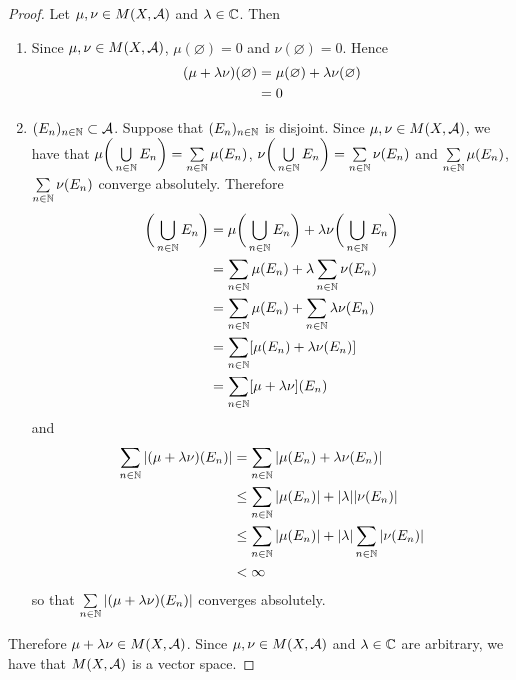 \documentclass{book}
\begin{document}
	\begin{proof}
		Let $\mu, \nu \in M(X, \mathcal{A})$ and $\lambda \in \mathbb{C}$. Then
		\begin{enumerate}
			\item Since $\mu,\nu \in M(X, \mathcal{A})$, $\mu(\varnothing) = 0$ and $\nu(\varnothing) = 0$. Hence
			\begin{align*}
				(\mu + \lambda \nu)(\varnothing)
				& = \mu(\varnothing) + \lambda \nu(\varnothing) \\
				& = 0
			\end{align*}
			\item $(E_n)_{n \in \mathbb{N}} \subset \mathcal{A}$. Suppose that $(E_n)_{n \in \mathbb{N}}$ is disjoint. Since $\mu,\nu \in M(X, \mathcal{A})$, we have that $\mu \bigg( \bigcup\limits_{n \in \mathbb{N}} E_n \bigg ) = \sum\limits_{n \in \mathbb{N}} \mu(E_n)$, $\nu \bigg( \bigcup\limits_{n \in \mathbb{N}} E_n \bigg) = \sum\limits_{n \in \mathbb{N}} \nu(E_n)$ and  $\sum\limits_{n \in \mathbb{N}} \mu(E_n)$, $\sum\limits_{n \in \mathbb{N}} \nu(E_n)$ converge absolutely. Therefore 
			\begin{align*}
				[\mu + \lam \nu] \bigg(  \bigcup_{n \in \N} E_n \bigg)
				& = \mu \bigg( \bigcup_{n \in \N} E_n \bigg ) + \lam \nu \bigg( \bigcup_{n \in \N} E_n \bigg ) \\
				& = \sum_{n \in \N} \mu(E_n) + \lam \sum_{n \in \N} \nu(E_n) \\
				& = \sum_{n \in \N} \mu(E_n) + \sum_{n \in \N} \lam \nu(E_n) \\
				& = \sum_{n \in \N}  [\mu(E_n)  + \lam \nu(E_n)] \\
				& = \sum_{n \in \N} [\mu + \lam \nu](E_n) \\
			\end{align*}
			and 
			\begin{align*}
				\sum_{n \in \mathbb{N}} | (\mu + \lambda \nu)(E_n) |
				& = \sum_{n \in \mathbb{N}} | \mu(E_n)  + \lambda \nu(E_n) | \\
				& \leq \sum_{n \in \mathbb{N}}  | \mu(E_n) |  + |\lambda| | \nu(E_n) | \\
				& \leq \sum_{n \in \mathbb{N}}  | \mu(E_n) |  + |\lambda|  \sum_{n \in \mathbb{N}} | \nu(E_n) | \\
				& < \infty 
			\end{align*}
			so that $\sum\limits_{n \in \mathbb{N}} | (\mu + \lambda \nu)(E_n) |$ converges absolutely.
		\end{enumerate}
		Therefore $\mu + \lambda \nu \in M(X, \mathcal{A})$. Since $\mu, \nu \in M(X, \mathcal{A})$ and $\lambda \in \mathbb{C}$ are arbitrary, we have that $M(X, \mathcal{A})$ is a vector space.
	\end{proof}
\end{document}
